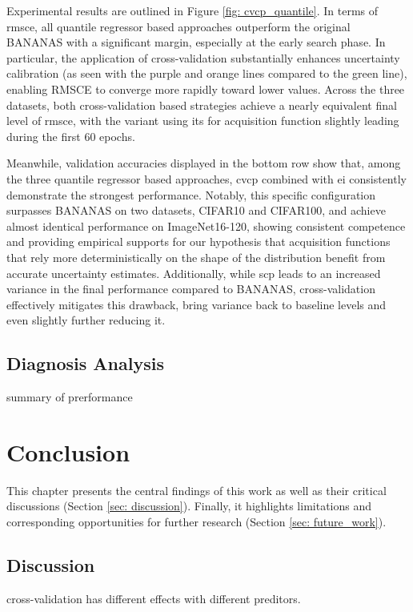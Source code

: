 \documentclass[a4paper,oneside,bibliography=totoc]{scrbook}
\begin{document}
\begin{description}[leftmargin=0cm, listparindent=\parindent]
 	Experimental results are outlined in Figure \ref{fig: cvcp_quantile}. In terms of \gls{rmsce}, all quantile regressor based approaches outperform the original BANANAS with a significant margin, especially at the early search phase. In particular, the application of cross-validation substantially enhances uncertainty calibration (as seen with the purple and orange lines compared to the green line), enabling RMSCE to converge more rapidly toward lower values. Across the three datasets, both cross-validation based strategies achieve a nearly equivalent final level of \gls{rmsce}, with the variant using \gls{its} for acquisition function slightly leading during the first 60 epochs.
 	
 	Meanwhile, validation accuracies displayed in the bottom row show that, among the three quantile regressor based approaches, \gls{cvcp} combined with \gls{ei} consistently demonstrate the strongest performance. Notably, this specific configuration surpasses BANANAS on two datasets, CIFAR10 and CIFAR100, and achieve almost identical performance on ImageNet16-120, showing consistent competence and providing empirical supports for our hypothesis that acquisition functions that rely more deterministically on the shape of the distribution benefit from accurate uncertainty estimates. Additionally, while \gls{scp} leads to an increased variance in the final performance compared to BANANAS, cross-validation effectively mitigates this drawback, bring variance back to baseline levels and even slightly further reducing it. 	    	 	
 	
 	\end{description}


\section{Diagnosis Analysis}

summary of prerformance



\chapter{Conclusion}
This chapter presents the central findings of this work as well as their critical discussions (Section \ref{sec: discussion}). Finally, it highlights limitations and corresponding opportunities for further research (Section \ref{sec: future_work}).

\section{Discussion}
cross-validation has different effects with different preditors.
\label{sec: discussion}
\end{document}

